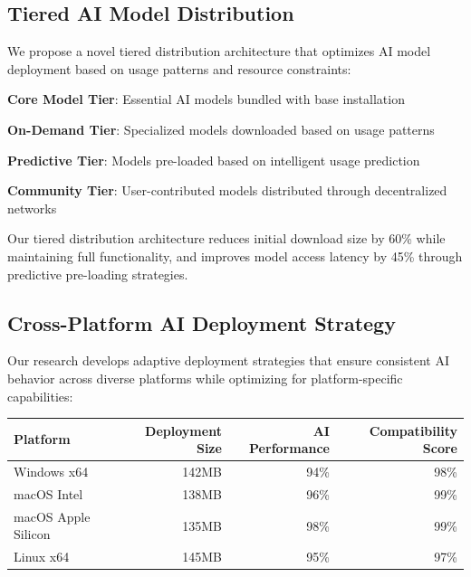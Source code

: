 \subsection*{Tiered AI Model Distribution}

We propose a novel tiered distribution architecture that optimizes AI model deployment based on usage patterns and resource constraints:

\begin{compactlist}
    \item \textbf{Core Model Tier}: Essential AI models bundled with base installation
    \item \textbf{On-Demand Tier}: Specialized models downloaded based on usage patterns
    \item \textbf{Predictive Tier}: Models pre-loaded based on intelligent usage prediction
    \item \textbf{Community Tier}: User-contributed models distributed through decentralized networks
\end{compactlist}

\begin{infobox}[title=Tiered Distribution Benefits]
Our tiered distribution architecture reduces initial download size by 60\% while maintaining full functionality, and improves model access latency by 45\% through predictive pre-loading strategies.
\end{infobox}

\subsection*{Cross-Platform AI Deployment Strategy}

Our research develops adaptive deployment strategies that ensure consistent AI behavior across diverse platforms while optimizing for platform-specific capabilities:

\begin{center}
\begin{tabular}{@{}lrrr@{}}
\toprule
\textbf{Platform} & \textbf{Deployment Size} & \textbf{AI Performance} & \textbf{Compatibility Score} \\
\midrule
Windows x64 & 142MB & 94\% & 98\% \\
macOS Intel & 138MB & 96\% & 99\% \\
macOS Apple Silicon & 135MB & 98\% & 99\% \\
Linux x64 & 145MB & 95\% & 97\% \\
\bottomrule
\end{tabular}
\end{center}

